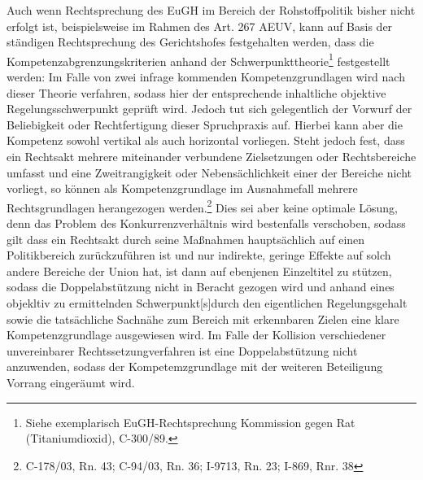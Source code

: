 \documentclass[12pt,a4paper,oneside]{book} %
\begin{document}
Auch wenn Rechtsprechung des EuGH im Bereich der Rohstoffpolitik bisher nicht erfolgt ist, beispielsweise im Rahmen des Art. 267 AEUV, kann auf Basis der ständigen Rechtsprechung des Gerichtshofes festgehalten werden, dass die Kompetenzabgrenzungskriterien anhand der \glqq Schwerpunkttheorie\grqq\footnote{Siehe exemplarisch EuGH-Rechtsprechung Kommission gegen Rat (Titaniumdioxid), C-300/89.} festgestellt werden: Im Falle von zwei infrage kommenden Kompetenzgrundlagen wird nach dieser Theorie verfahren, sodass hier der entsprechende inhaltliche objektive Regelungsschwerpunkt geprüft wird\autocite[Callies, Art. 175, Rn 22 sowie Kahl, Art. 95, Rn 73ff]{callies_euvaeuv_2022}. Jedoch tut sich gelegentlich der Vorwurf der Beliebigkeit oder Rechtfertigung dieser Spruchpraxis auf.\autocite{Nettesheim, Grabits/Hilf/Nettesheim, AEUV Art 194 Rn. 35} Hierbei kann aber die Kompetenz sowohl vertikal als auch horizontal vorliegen.\autocite[30f.]{callies_stellungnahme_2007} Steht jedoch fest, dass ein Rechtsakt mehrere miteinander verbundene Zielsetzungen oder Rechtsbereiche umfasst und eine Zweitrangigkeit oder Nebensächlichkeit einer der Bereiche nicht vorliegt, so können als Kompetenzgrundlage im Ausnahmefall mehrere Rechtsgrundlagen herangezogen werden.\footnote{C-178/03, Rn. 43; C-94/03, Rn. 36; I-9713, Rn. 23;  I-869, Rnr. 38} Dies sei aber keine optimale Lösung, denn das Problem des Konkurrenzverhältnis wird bestenfalls verschoben, sodass gilt dass ein Rechtsakt durch seine Maßnahmen hauptsächlich auf einen Politikbereich zurückzuführen ist und nur indirekte, geringe Effekte auf solch andere Bereiche der Union hat, ist dann auf ebenjenen Einzeltitel zu stützen, sodass die Doppelabstützung nicht in Beracht gezogen wird und anhand eines \glqq objekltiv zu ermittelnden Schwerpunkt[s]\grqq durch den eigentlichen Regelungsgehalt sowie die tatsächliche Sachnähe zum Bereich mit erkennbaren Zielen eine klare Kompetenzgrundlage ausgewiesen wird.\autocite{Callies, Berliner Beiträge 137, S. 40} Im Falle der Kollision verschiedener unvereinbarer  Rechtssetzungverfahren ist eine Doppelabstützung nicht anzuwenden, sodass der Kompetemzgrundlage mit der weiteren Beteiligung Vorrang eingeräumt wird.\autocite{Callies, Berliner Beiträge 137, S. 40}
\end{document}
